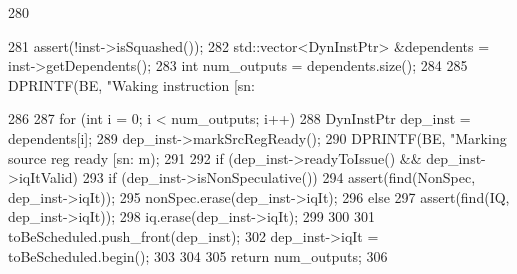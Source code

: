 \begin{DoxyCode}
280 {
281     assert(!inst->isSquashed());
282     std::vector<DynInstPtr> &dependents = inst->getDependents();
283     int num_outputs = dependents.size();
284 
285     DPRINTF(BE, "Waking instruction [sn:%
      
286 
287     for (int i = 0; i < num_outputs; i++) {
288         DynInstPtr dep_inst = dependents[i];
289         dep_inst->markSrcRegReady();
290         DPRINTF(BE, "Marking source reg ready [sn:%
      m);
291 
292         if (dep_inst->readyToIssue() && dep_inst->iqItValid) {
293             if (dep_inst->isNonSpeculative()) {
294                 assert(find(NonSpec, dep_inst->iqIt));
295                 nonSpec.erase(dep_inst->iqIt);
296             } else {
297                 assert(find(IQ, dep_inst->iqIt));
298                 iq.erase(dep_inst->iqIt);
299             }
300 
301             toBeScheduled.push_front(dep_inst);
302             dep_inst->iqIt = toBeScheduled.begin();
303         }
304     }
305     return num_outputs;
306 }
\end{DoxyCode}


